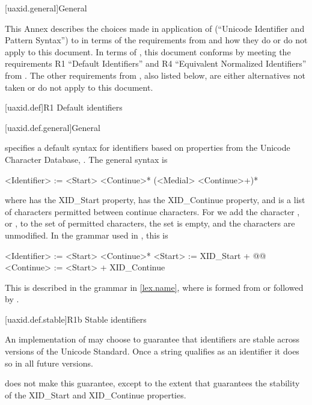 
[uaxid.general]{General}

\pnum
This Annex describes the choices made in application of
 (``Unicode Identifier and Pattern Syntax'')
to \Cpp{} in terms of the requirements from  and
how they do or do not apply to this document.
In terms of ,
this document conforms by meeting the requirements
R1 ``Default Identifiers'' and
R4 ``Equivalent Normalized Identifiers'' from .
The other requirements from , also listed below,
are either alternatives not taken or do not apply to this document.

[uaxid.def]{R1 Default identifiers}

[uaxid.def.general]{General}
%
%

\pnum
{} specifies a default syntax for identifiers
based on properties from the Unicode Character Database, .
The general syntax is
\begin{outputblock}
<Identifier> := <Start> <Continue>* (<Medial> <Continue>+)*
\end{outputblock}
where  has the XID_Start property,
 has the XID_Continue property, and
 is a list of characters permitted between continue characters.
For \Cpp{} we add the character , or \tcode{_},
to the set of permitted  characters,
the  set is empty, and
the  characters are unmodified.
In the grammar used in , this is
\begin{outputblock}
<Identifier> := <Start> <Continue>*
<Start> := XID_Start + @\textrm{}@
<Continue> := <Start> + XID_Continue
\end{outputblock}

\pnum
This is described in the \Cpp{} grammar in \ref{lex.name},
where  is formed from
 or
 followed by .

[uaxid.def.stable]{R1b Stable identifiers}

\pnum
An implementation of  may choose to guarantee
that identifiers are stable across versions of the Unicode Standard.
Once a string qualifies as an identifier it does so in all future versions.

\pnum
\Cpp{} does not make this guarantee,
except to the extent that  guarantees
the stability of the XID_Start and XID_Continue properties.

